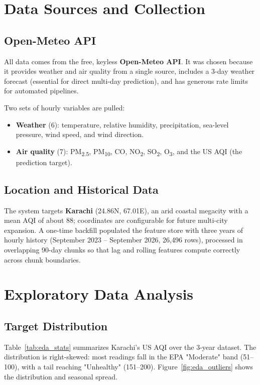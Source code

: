 \documentclass[12pt, a4paper]{article}
\begin{document}
\section{Data Sources and Collection}

\subsection{Open-Meteo API}
All data comes from the free, keyless \textbf{Open-Meteo API}. It was chosen because it provides weather and air quality from a single source, includes a 3-day weather forecast (essential for direct multi-day prediction), and has generous rate limits for automated pipelines.

Two sets of hourly variables are pulled:
\begin{itemize}
  \item \textbf{Weather} (6): temperature, relative humidity, precipitation, sea-level pressure, wind speed, and wind direction.
  \item \textbf{Air quality} (7): PM\textsubscript{2.5}, PM\textsubscript{10}, CO, NO\textsubscript{2}, SO\textsubscript{2}, O\textsubscript{3}, and the US AQI (the prediction target).
\end{itemize}

\subsection{Location and Historical Data}
The system targets \textbf{Karachi} (24.86\textdegree N, 67.01\textdegree E), an arid coastal megacity with a mean AQI of about 88; coordinates are configurable for future multi-city expansion. A one-time backfill populated the feature store with three years of hourly history (September 2023 -- September 2026, 26,496 rows), processed in overlapping 90-day chunks so that lag and rolling features compute correctly across chunk boundaries.


\section{Exploratory Data Analysis}

\subsection{Target Distribution}
Table~\ref{tab:eda_stats} summarizes Karachi's US AQI over the 3-year dataset. The distribution is right-skewed: most readings fall in the EPA "Moderate" band (51--100), with a tail reaching "Unhealthy" (151--200). Figure~\ref{fig:eda_outliers} shows the distribution and seasonal spread.
\end{document}
